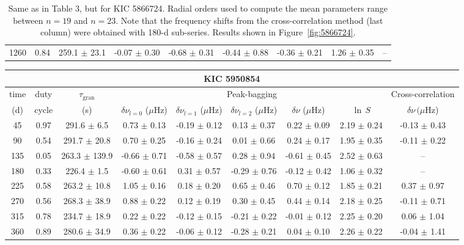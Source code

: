 \documentclass[twocolumn]{aastex61}%
\begin{document}
\begin{table}[ht]
\begin{tabular}{ccc|ccccc|c}
1260 & 0.84 & 259.1 $\pm$ 23.1 & -0.07 $\pm$ 0.30 & -0.68 $\pm$ 0.31 & -0.44 $\pm$ 0.88 & -0.36 $\pm$ 0.21 & 1.26 $\pm$ 0.35 & --\\
\end{tabular}
\parbox{2\hsize}{\caption{Same as in Table 3, but for KIC 5866724. {Radial orders used to compute the mean parameters range between $n=19$ and $n=23$.} Note that the frequency shifts from the cross-correlation method (last column) were obtained with 180-d sub-series. Results shown in Figure~\ref{fig:5866724}.}\label{tab:5866724}}
\end{table}

\begin{table*}[ht]\centering\fontsize{9.}{7.}\selectfont
\begin{tabular}{ccc|ccccc|c}
\multicolumn{9}{c}{KIC 5950854}\\ \hline\hline
time & duty & $\tau_\text{gran}$ &\multicolumn{5}{c|}{Peak-bagging}&Cross-correlation\\
(d)& cycle & (s)&$\delta\nu_{l=0}$ ($\mu$Hz) & $\delta\nu_{l=1}$ ($\mu$Hz) & $\delta\nu_{l=2}$ ($\mu$Hz) & $\delta\nu$ ($\mu$Hz)& $\ln\,S$ & $\delta\nu\,(\mu$Hz)\\\hline
45 & 0.97 & 291.6 $\pm$ 6.5 & 0.73 $\pm$ 0.13 & -0.19 $\pm$ 0.12 & 0.13 $\pm$ 0.37 & 0.22 $\pm$ 0.09 & 2.19 $\pm$ 0.24 & -0.13 $\pm$ 0.43\\
90 & 0.54 & 291.7 $\pm$ 20.8 & 0.70 $\pm$ 0.25 & -0.16 $\pm$ 0.24 & 0.01 $\pm$ 0.66 & 0.24 $\pm$ 0.17 & 1.95 $\pm$ 0.35 & -0.11 $\pm$ 0.22\\
135 & 0.05 & 263.3 $\pm$ 139.9 & -0.66 $\pm$ 0.71 & -0.58 $\pm$ 0.57 & 0.28 $\pm$ 0.94 & -0.61 $\pm$ 0.45 & 2.52 $\pm$ 0.63 & --\\
180 & 0.33 & 226.4 $\pm$ 1.5 & -0.60 $\pm$ 0.61 & 0.31 $\pm$ 0.57 & -0.29 $\pm$ 0.76 & -0.12 $\pm$ 0.42 & 1.06 $\pm$ 0.32 & --\\
225 & 0.58 & 263.2 $\pm$ 10.8 & 1.05 $\pm$ 0.16 & 0.18 $\pm$ 0.20 & 0.65 $\pm$ 0.46 & 0.70 $\pm$ 0.12 & 1.85 $\pm$ 0.21 & 0.37 $\pm$ 0.97\\
270 & 0.56 & 268.3 $\pm$ 38.9 & 0.88 $\pm$ 0.22 & 0.12 $\pm$ 0.19 & 0.30 $\pm$ 0.45 & 0.44 $\pm$ 0.14 & 2.18 $\pm$ 0.25 & -0.11 $\pm$ 0.71\\
315 & 0.78 & 234.7 $\pm$ 18.9 & 0.22 $\pm$ 0.22 & -0.12 $\pm$ 0.15 & -0.21 $\pm$ 0.22 & -0.01 $\pm$ 0.12 & 2.25 $\pm$ 0.20 & 0.06 $\pm$ 1.04\\
360 & 0.89 & 280.6 $\pm$ 34.9 & 0.36 $\pm$ 0.22 & -0.06 $\pm$ 0.12 & -0.28 $\pm$ 0.21 & 0.04 $\pm$ 0.10 & 2.26 $\pm$ 0.22 & -0.04 $\pm$ 1.41\\

\end{tabular}
\end{table*}
\end{document}
